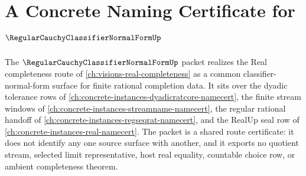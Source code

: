 \chapter{A Concrete Naming Certificate for $\RegularCauchyClassifierNormalFormUp$}
\label{ch:concrete-instances-regular-cauchy-classifier-normal-form-namecert}

The $\RegularCauchyClassifierNormalFormUp$ packet realizes the Real completeness route of \autoref{ch:visions-real-completeness} as a common classifier-normal-form surface for finite rational completion data. It sits over the dyadic tolerance rows of \autoref{ch:concrete-instances-dyadicratcore-namecert}, the finite stream windows of \autoref{ch:concrete-instances-streamname-namecert}, the regular rational handoff of \autoref{ch:concrete-instances-regseqrat-namecert}, and the RealUp seal row of \autoref{ch:concrete-instances-real-namecert}. The packet is a shared route certificate: it does not identify any one source surface with another, and it exports no quotient stream, selected limit representative, host real equality, countable choice row, or ambient completeness theorem.

